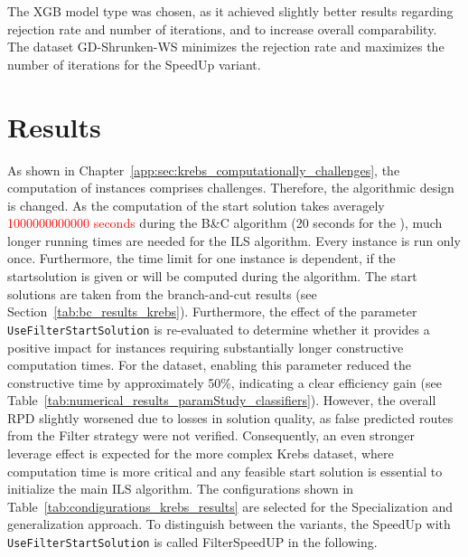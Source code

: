 The \gls{XGB} model type was chosen, as it achieved slightly better results
regarding rejection rate and number of iterations, and to increase overall comparability.
The dataset GD-Shrunken-WS minimizes the rejection rate and maximizes the number of iterations for the SpeedUp variant.

\section{Results}
\label{sec:results_krebs}
As shown in Chapter~\ref{app:sec:krebs_computationally_challenges}, the computation of \krebsADataSetText instances comprises
challenges. Therefore, the algorithmic design is changed. As the computation of the start solution takes averagely \textcolor{red}{1000000000000 seconds}
during the B\&C algorithm (20 seconds for the \gendreauDataSet), much longer running times are needed for the \gls{ILS} algorithm.
Every instance is run only once. Furthermore, the time limit for one instance
is dependent, if the startsolution is given or will be computed during the algorithm. The start solutions are taken from the branch-and-cut
results (see Section~\ref{tab:bc_results_krebs}). Furthermore, the effect of the parameter \texttt{UseFilterStartSolution} is re-evaluated to determine whether
it provides a positive impact for instances requiring substantially longer constructive computation times. For the \gendreauDataSetText dataset,
enabling this parameter reduced the constructive time by approximately 50\%, indicating a clear efficiency gain (see Table~\ref{tab:numerical_results_paramStudy_classifiers}). However,
the overall \gls{RPD} slightly worsened due to losses in solution quality, as false predicted routes from the Filter strategy were not verified.
Consequently, an even stronger leverage effect is expected for the more complex Krebs dataset, where computation time is more critical
and any feasible start solution is essential to initialize the main \gls{ILS} algorithm. The configurations shown in Table~\ref{tab:condigurations_krebs_results} are selected for the
Specialization and generalization approach. To distinguish between the variants, the SpeedUp with \texttt{UseFilterStartSolution} is
called FilterSpeedUP in the following.

